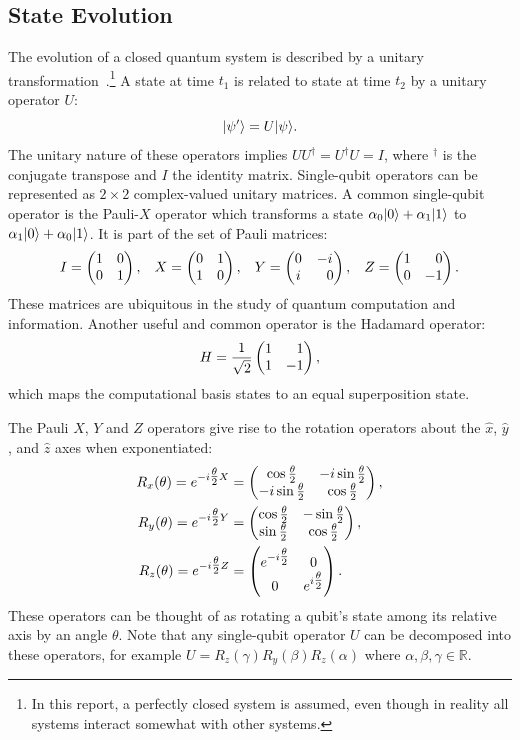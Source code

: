 \subsection{State Evolution} \label{sec:state-evolution}
The evolution of a closed quantum system is described by a unitary transformation~\cite[Section 2.2]{nielsen2002quantum}.\footnote{In this report, a perfectly closed system is assumed, even though in reality all systems interact somewhat with other systems.}
A state \ket{\psi} at time $t_1$ is related to state  at time $t_2$ by a unitary operator $U$:
\begin{equation}
\vert{\psi'}\rangle = U\vert{\psi}\rangle.
\end{equation}
The unitary nature of these operators implies $UU^\dagger = U^\dagger U = I$, where $^\dagger$ is the conjugate transpose and $I$ the identity matrix.
Single-qubit operators can be represented as $2 \times 2$ complex-valued unitary matrices.
A common single-qubit operator is the Pauli-$X$ operator which transforms a state $\alpha_0\vert{0}\rangle + \alpha_1\vert{1}\rangle$ to $\alpha_1\vert{0}\rangle + \alpha_0\vert{1}\rangle$.
It is part of the set of Pauli matrices:
\begin{equation}
I = \igate{}, \hspace*{3mm}
X = \xgate{}, \hspace*{3mm}
Y = \ygate{}, \hspace*{3mm}
Z = \zgate{}.
\end{equation}
These matrices are ubiquitous in the study of quantum computation and information.
Another useful and common operator is the Hadamard operator:
\begin{equation}
H = \hgate{},
\end{equation}
which maps the computational basis states to an equal superposition state.

The Pauli $X$, $Y$ and $Z$ operators give rise to the rotation operators about the $\hat{x}$, $\hat{y}$, and $\hat{z}$ axes when exponentiated:
\begin{align}
R_x(\theta) = e^{-i\tfrac{\theta}{2} X} &= \begin{pmatrix} \cos\tfrac{\theta}{2} & -i\sin\tfrac{\theta}{2} \\ -i\sin\tfrac{\theta}{2} & \cos\tfrac{\theta}{2} \end{pmatrix}{}, \\
R_y(\theta) = e^{-i\tfrac{\theta}{2} Y} &= \begin{pmatrix} \cos\tfrac{\theta}{2} & -\sin\tfrac{\theta}{2} \\ \sin\tfrac{\theta}{2} & \cos\tfrac{\theta}{2} \end{pmatrix}{}, \\
R_z(\theta) = e^{-i\tfrac{\theta}{2} Z} &= \begin{pmatrix} e^{-i\tfrac{\theta}{2}} & 0 \\ 0 & e^{i\tfrac{\theta}{2}} \end{pmatrix}{}.
\end{align}
These operators can be thought of as rotating a qubit's state among its relative axis by an angle $\theta$.
Note that any single-qubit operator $U$ can be decomposed into these operators, for example $U = R_z(\gamma)R_y(\beta)R_z(\alpha)$ where $\alpha, \beta, \gamma \in \mathbb{R}$.

